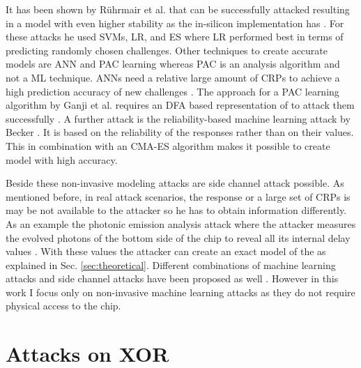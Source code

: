 It has been shown by Rührmair et al. that \apufs can be successfully attacked resulting in a model with even higher stability as the \apuf in-silicon implementation has \cite{Ruhrmair2010ModelingFunctions}.
For these attacks he used \acp{SVM}, \ac{LR}, and \ac{ES} where \ac{LR} performed best in terms of predicting randomly chosen challenges.
Other techniques to create accurate \apuf models are \ac{ANN} and \ac{PAC} learning whereas \ac{PAC} is an analysis algorithm and not a \ac{ML} technique. 
\acp{ANN} need a relative large amount of \acp{CRP} to achieve a high prediction accuracy of new challenges \cite{Hospodar2012MachineUsability}.
The approach for a \ac{PAC} learning algorithm by Ganji et al. requires an \ac{DFA} based representation of \apufs to attack them successfully \cite{Ganji2016PACPUFs}.
A further attack is the reliability-based machine learning attack by Becker \cite{Becker2015ThePUFs}.
It is based on the reliability of the \puf responses rather than on their values. 
This in combination with an \ac{CMA-ES} algorithm makes it possible to create \apuf model with high accuracy.

Beside these non-invasive modeling attacks are side channel attack possible.
As mentioned before, in real attack scenarios, the \puf response or a large set of \acp{CRP} is may be not available to the attacker so he has to obtain information differently.
As an example the photonic emission analysis attack where the attacker measures the evolved photons of the bottom side of the \apuf chip to reveal all its internal delay values \cite{Tajik2014PhysicalPUFs}.
With these values the attacker can create an exact model of the \apuf as explained in Sec. \ref{sec:theoretical}.
Different combinations of machine learning attacks and side channel attacks have been proposed as well \cite{Mahmoud2013CombinedPUFs, Xu2014Hybrid}.
However in this work I focus only on non-invasive machine learning attacks as they do not require physical access to the \apuf chip.


\section{Attacks on \acs{XOR} \apufs}
\label{sec:attacksonxorarbiter}

